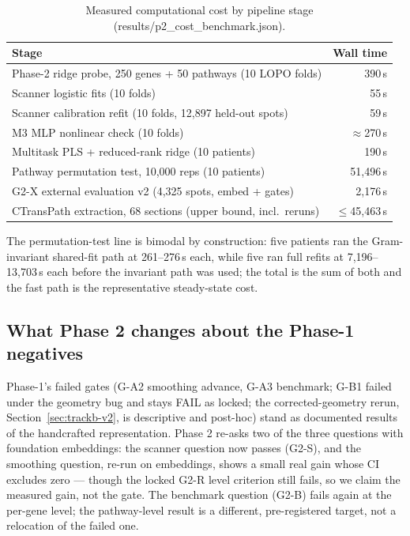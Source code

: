 \documentclass[11pt]{article}
\begin{document}
\begin{table}[h]
\centering\small
\caption{Measured computational cost by pipeline stage (results/p2\_cost\_benchmark.json).}
\label{tab:cost}
\begin{tabular}{lr}
\hline
Stage & Wall time \\
\hline
Phase-2 ridge probe, 250 genes + 50 pathways (10 LOPO folds) & 390\,s \\
Scanner logistic fits (10 folds) & 55\,s \\
Scanner calibration refit (10 folds, 12{,}897 held-out spots) & 59\,s \\
M3 MLP nonlinear check (10 folds) & $\approx$270\,s \\
Multitask PLS + reduced-rank ridge (10 patients) & 190\,s \\
Pathway permutation test, 10{,}000 reps (10 patients) & 51{,}496\,s \\
G2-X external evaluation v2 (4{,}325 spots, embed + gates) & 2{,}176\,s \\
CTransPath extraction, 68 sections (upper bound, incl.\ reruns) & $\le$45{,}463\,s \\
\hline
\end{tabular}
\end{table}

The permutation-test line is bimodal by construction: five patients ran the
Gram-invariant shared-fit path at 261--276\,s each, while five ran full
refits at 7{,}196--13{,}703\,s each before the invariant path was used;
the total is the sum of both and the fast path is the representative
steady-state cost.

\subsection{What Phase 2 changes about the Phase-1 negatives}
Phase-1's failed gates (G-A2 smoothing advance, G-A3 benchmark; G-B1 failed under the
geometry bug and stays FAIL as locked; the corrected-geometry rerun, Section~\ref{sec:trackb-v2}, is descriptive and post-hoc)
stand as documented results of the handcrafted representation. Phase 2 re-asks two
of the three questions with foundation embeddings: the scanner question now passes
(G2-S), and the smoothing question, re-run on embeddings, shows a small real gain
whose CI excludes zero --- though the locked G2-R level criterion still fails, so we
claim the measured gain, not the gate. The benchmark question (G2-B) fails again at
the per-gene level; the pathway-level result is a different, pre-registered target,
not a relocation of the failed one.
\end{document}

